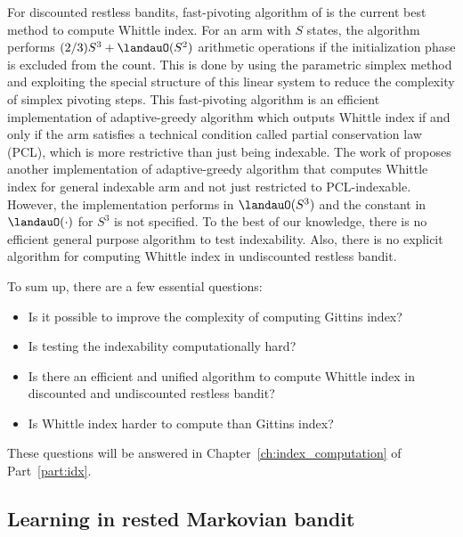 For discounted restless bandits, fast-pivoting algorithm of \cite{nino2020fast} is the current best method to compute Whittle index.
For an arm with $S$ states, the algorithm performs $(2/3)S^3+\landauO(S^2)$ arithmetic operations if the initialization phase is excluded from the count.
This is done by using the parametric simplex method and exploiting the special structure of this linear system to reduce the complexity of simplex pivoting steps. This fast-pivoting algorithm is an efficient implementation of adaptive-greedy algorithm \cite{nino2007dynamic} which outputs Whittle index if and only if the arm satisfies a technical condition called partial conservation law (PCL), which is more restrictive than just being indexable.
The work of \cite{akbarzadeh2020conditions} proposes another implementation of adaptive-greedy algorithm that computes Whittle index for general indexable arm and not just restricted to PCL-indexable.
However, the implementation performs in $\landauO(S^3)$ and the constant in $\landauO(\cdot)$ for $S^3$ is not specified.
To the best of our knowledge, there is no efficient general purpose algorithm to test indexability.
Also, there is no explicit algorithm for computing Whittle index in undiscounted restless bandit.

To sum up, there are a few essential questions:
\begin{itemize}
    \item Is it possible to improve the complexity of computing Gittins index?
    \item Is testing the indexability computationally hard?
    \item Is there an efficient and unified algorithm to compute Whittle index in discounted and undiscounted restless bandit?
    \item Is Whittle index harder to compute than Gittins index?
\end{itemize}

These questions will be answered in Chapter~\ref{ch:index_computation} of Part~\ref{part:idx}.

\subsection{Learning in rested Markovian bandit}

